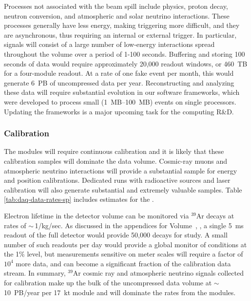 Processes not associated with the beam spill %
include  physics, proton decay, neutron conversion, and atmospheric and solar neutrino interactions.  These processes generally have less energy, making triggering more difficult, and they are  asynchronous, thus requiring an internal or external trigger.  In particular,  signals will consist of a large number of low-energy interactions spread throughout the  volume over a period of 1-100 seconds. Buffering and storing 100 seconds of  data would require approximately 20,000 readout windows, or \SI{460}{TB} for a four-module  readout.  At a rate of one fake  event per month, this would generate  \SI{6}{PB} of uncompressed data per year.  Reconstructing and analyzing these data will require substantial evolution in our software frameworks, which were developed to process small (\SIrange{1}{100}{MB}) events on single processors. %
Updating the frameworks is a major upcoming task for the  computing R\&D. %

\subsubsection{Calibration}
\label{sec:exec-comp-cal}

The  modules will require continuous calibration and it is likely that these calibration samples %
will dominate the data volume. Cosmic-ray muons and atmospheric neutrino interactions will provide a substantial sample for energy and position calibrations.  Dedicated runs with radioactive sources and laser calibration will also generate substantial and extremely valuable samples. Table \ref{tab:daq-data-rates-sp} includes estimates for the %
. 

Electron lifetime in the detector volume can be monitored via $^{39}$Ar decays  at rates of $\sim\,$1/kg/sec. As discussed in the appendices for 
Volume~\volnumberphysics{}, \voltitlephysics{},  a single \SI{5}{ms} readout of the full detector would provide 50,000 decays for study.  A small number of such readouts per day would provide a global monitor of conditions at the 1\% level, but measurements sensitive on meter scales will require a factor of $10^4$ more data, and can become a significant fraction of the calibration data stream. In summary, $^{39}$Ar cosmic ray and atmospheric neutrino signals collected for calibration make up the bulk of the uncompressed  data volume at $\sim\,$\SI{10}{PB/year} per \SI{17}{kt} module and will dominate the rates from the  modules.  

